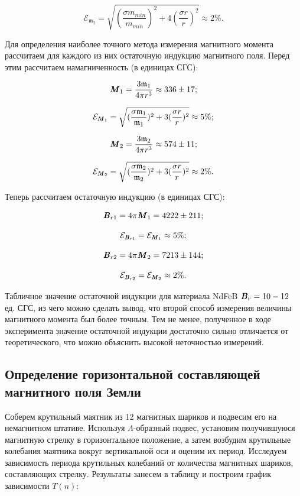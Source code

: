 \documentclass[a4paper,12pt]{article} %
\begin{document}
$$
\mathcal{E}_{\mathfrak{m}_{2}} = \sqrt{(\frac{\sigma{m_{min}}}{m_{min}})^2 + 4(\frac{\sigma{r}}{r})^2} \approx 2 \%.
$$

\hfill \break Для определения наиболее точного метода измерения магнитного момента рассчитаем для каждого из них остаточную индукцию магнитного поля. Перед этим рассчитаем намагниченность (в единицах СГС):

$$
\textbf{\textit{M}}_1 = \frac{3\mathfrak{m}_{1}}{4\pi r^3} \approx 336 \pm 17;
$$

$$
\mathcal{E}_{\textbf{\textit{M}}_{1}} = \sqrt{(\frac{\sigma{\mathfrak{m}_{1}}}{\mathfrak{m}_{1}})^2 + 3(\frac{\sigma{r}}{r})^2} \approx 5 \%;
$$

$$
\textbf{\textit{M}}_2 = \frac{3\mathfrak{m}_{2}}{4\pi r^3} \approx 574 \pm 11;
$$

$$
\mathcal{E}_{\textbf{\textit{M}}_{2}} = \sqrt{(\frac{\sigma{\mathfrak{m}_{2}}}{\mathfrak{m}_{2}})^2 + 3(\frac{\sigma{r}}{r})^2} \approx 2 \%.
$$

\hfill \break Теперь рассчитаем остаточную индукцию (в единицах СГС): 

$$
\textbf{\textit{B}}_{r1} = 4\pi \textbf{\textit{M}}_1 = 4222 \pm 211;
$$

$$
\mathcal{E}_{\textbf{\textit{B}}_{r1}} = \mathcal{E}_{\textbf{\textit{M}}_{1}} \approx 5 \%;
$$

$$
\textbf{\textit{B}}_{r2} = 4\pi \textbf{\textit{M}}_2 = 7213 \pm 144;
$$

$$
\mathcal{E}_{\textbf{\textit{B}}_{r2}} = \mathcal{E}_{\textbf{\textit{M}}_{2}} \approx 2 \%.
$$

\hfill \break Табличное значение остаточной индукции для материала NdFeB $\textbf{\textit{B}}_{r} = 10 - 12$ ед. СГС, из чего можно сделать вывод, что второй способ измерения величины магнитного момента был более точным. Тем не менее, полученное в ходе эксперимента значение остаточной индукции достаточно сильно отличается от теоретического, что можно объяснить высокой неточностью измерений.

\subsection{Определение горизонтальной составляющей магнитного поля Земли}

\hfill \break Соберем крутильный маятник из 12 магнитных шариков и подвесим его на немагнитном штативе. Используя $\Lambda$-образный подвес, установим получившуюся магнитную стрелку в горизонтальное положение, а затем возбудим крутильные колебания маятника вокруг вертикальной оси и оценим их период. Исследуем зависимость периода крутильных колебаний от количества магнитных шариков, составляющих стрелку. Результаты занесем в таблицу и построим график зависимости $T(n)$:
\end{document}
